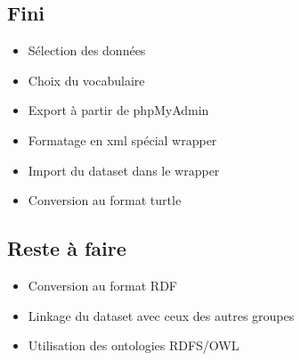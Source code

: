 \documentclass[12pt,a4paper]{article}
\begin{document}
	\subsection{Fini}
		\begin{itemize}		
			\item{Sélection des données}
			\item{Choix du vocabulaire}
			\item{Export à partir de phpMyAdmin}
			\item{Formatage en xml spécial wrapper}
			\item{Import du dataset dans le wrapper}
			\item{Conversion au format turtle}
		\end{itemize}
	\subsection{Reste à faire}
		\begin{itemize}
			\item{Conversion au format RDF}
			\item{Linkage du dataset avec ceux des autres groupes}
			\item{Utilisation des ontologies RDFS/OWL}
		\end{itemize}
\end{document}
